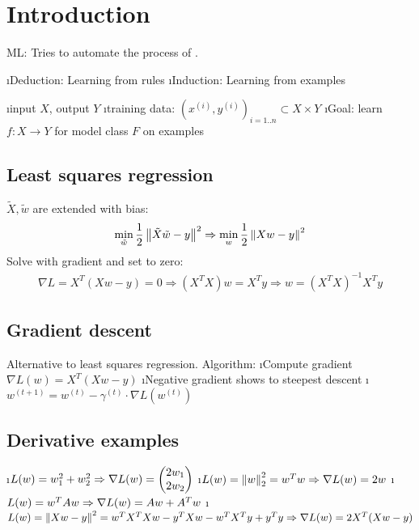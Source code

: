 \section{Introduction}

ML: Tries to automate the process of .

\be
\i Deduction: Learning from rules
\i Induction: Learning from examples
\ee


\bi
\i input $X$, output $Y$
\i training data: $(x^{(i)}, y^{(i)})_{i=1..n} \subset X \times Y$
\i Goal: learn $f: X \to Y$ for model class $F$ on examples
\ei

\subsection{Least squares regression}
$\tilde X, \tilde w$ are extended with bias:
\begin{align*}
\min_{\tilde w} \frac{1}{2} \left\lVert\tilde X \tilde w - y\right\rVert^2 \Rightarrow \min_w \frac{1}{2} \left\lVert Xw-y\right\rVert^2
\end{align*}
Solve with gradient and set to zero:
\begin{align*}
\nabla L = X^T(Xw-y) = 0 \Rightarrow (X^TX)w = X^Ty \Rightarrow w = (X^TX)^{-1}X^Ty
\end{align*}

\subsection{Gradient descent}
Alternative to least squares regression. Algorithm:
\be
\i Compute gradient $\nabla L(w) = X^T(Xw-y)$
\i Negative gradient shows to steepest descent
\i $w^{(t+1)} = w^{(t)} - \gamma^{(t)} \cdot \nabla L(w^{(t)})$
\ee

\subsection{Derivative examples}

\bi
\i $L(w) = w_1^2 + w_2^2 \\\Rightarrow \nabla L(w) = \begin{pmatrix} 2w_1\\2w_2 \end{pmatrix}$
\i $L(w) = \left\lVert w\right\rVert ^2_2 = w^Tw \\\Rightarrow \nabla L(w) = 2w$
\i $L(w) = w^TAw \\\Rightarrow \nabla L(w) = Aw + A^Tw$
\i $L(w) = \left\lVert Xw-y\right\rVert^2 = w^TX^TXw - y^TXw - w^TX^Ty + y^Ty \\\Rightarrow \nabla L(w) = 2X^T(Xw - y)$
\ei

